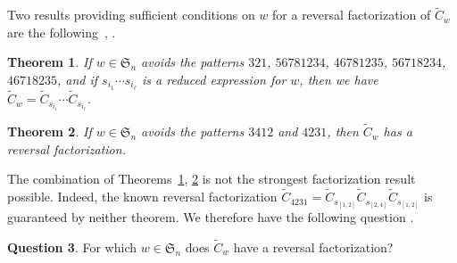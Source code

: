 \documentclass[12pt]{amsart}
\newtheorem{thm}{Theorem}[section]
\theoremstyle{definition}
\newtheorem{quest}[thm]{Question}
\numberwithin{equation}{section}
\newcommand{\sn}{\mathfrak{S}_n}
\newcommand{\wtc}[2]{\widetilde{C}_{#1}}
\newcommand{\avoidsp}{avoids the patterns $3412$ and $4231${}}
\begin{document}
Two results providing sufficient conditions on $w$ for a reversal factorization of $\wtc wq$ are the following~\cite[Thm.\,1]{BWHex}, \cite[Thm.\,4.3]{SkanNNDCB}.
\begin{thm}\label{t:BWHex}
If $w \in \sn$ avoids the patterns $321$, $56781234$, $46781235$, $56718234$, $46718235$,
and if $s_{i_1} \cdots s_{i_\ell}$ is a reduced expression for $w$, then we have
$\wtc wq = \wtc {s_{i_1}}q \cdots \wtc {s_{i_\ell}}q$.
\end{thm}
\begin{thm}\label{t:SkanSmooth}
    If $w \in \sn$ \avoidsp, then $\wtc wq$ has a reversal factorization.
\end{thm}
The combination of Theorems~\ref{t:BWHex}, \ref{t:SkanSmooth} is not the strongest factorization result possible.
Indeed, the known reversal factorization $\wtc{4231}q = \wtc{s_{[1,2]}}q \wtc{s_{[2,4]}}q \wtc{s_{[1,2]}}q$ is guaranteed by neither theorem. We therefore have the following question \cite[Quest.\,4.5]{SkanNNDCB}.
\begin{quest}
    For which $w \in \sn$ does $\wtc wq$ have a reversal factorization?
\end{quest}

\end{document}
